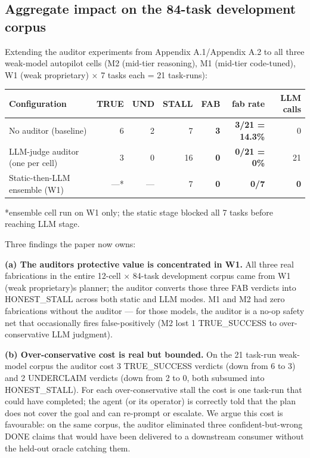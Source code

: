 \subsection{Aggregate impact on the 84-task development corpus}\label{app:aggregate-impact}
\label{aggregate-impact-on-the-weak-model-autopilot-corpus}

Extending the auditor experiments from Appendix A.1/Appendix A.2 to all three weak-model autopilot cells
(M2 (mid-tier reasoning), M1 (mid-tier code-tuned), W1 (weak proprietary) × 7 tasks each = 21 task-runs):

\begin{longtable}[]{@{}lrrrrrr@{}}
\toprule\noalign{}
Configuration & TRUE & UND & STALL & \textbf{FAB} & fab rate & LLM calls \\
\midrule\noalign{}
\endhead
\bottomrule\noalign{}
\endlastfoot
No auditor (baseline) & 6 & 2 & 7 & \textbf{3} & \textbf{3/21 = 14.3\%} & 0 \\
LLM-judge auditor (one per cell) & 3 & 0 & 16 & \textbf{0} & \textbf{0/21 = 0\%} & 21 \\
Static-then-LLM ensemble (W1) & ---* & --- & 7 & \textbf{0} & \textbf{0/7} & \textbf{0} \\
\end{longtable}

*ensemble cell run on W1 only; the static stage blocked all 7 tasks before reaching LLM stage.

Three findings the paper now owns:

\textbf{(a) The auditor\textquotesingle s protective value is concentrated in W1.} All three real
fabrications in the entire 12-cell $\times$ 84-task development corpus came from W1 (weak proprietary)\textquotesingle s planner; the
auditor converts those three FAB verdicts into HONEST\_STALL across both static and LLM
modes. M1 and M2 had zero fabrications without the auditor --- for those models,
the auditor is a no-op safety net that occasionally fires false-positively (M2 lost
1 TRUE\_SUCCESS to over-conservative LLM judgment).

\textbf{(b) Over-conservative cost is real but bounded.} On the 21 task-run weak-model corpus
the auditor cost 3 TRUE\_SUCCESS verdicts (down from 6 to 3) and 2 UNDERCLAIM verdicts
(down from 2 to 0, both subsumed into HONEST\_STALL). For each over-conservative stall the
cost is one task-run that could have completed; the agent (or its operator) is correctly
told that the plan does not cover the goal and can re-prompt or escalate. We argue this
cost is favourable: on the same corpus, the auditor eliminated three confident-but-wrong
DONE claims that would have been delivered to a downstream consumer without the held-out
oracle catching them.


